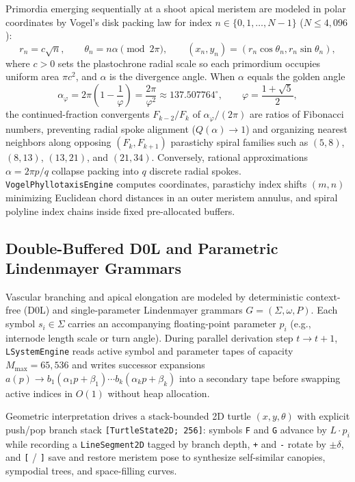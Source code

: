 \documentclass[12pt]{article}
\begin{document}
Primordia emerging sequentially at a shoot apical meristem are modeled in polar coordinates by Vogel's disk packing law \cite{vogel1979better} for index $n \in \{0, 1, \dots, N-1\}$ ($N \le 4{,}096$):
\begin{equation}
r_n = c \sqrt{n}, \qquad \theta_n = n \alpha \pmod{2\pi}, \qquad (x_n, y_n) = (r_n \cos\theta_n, r_n \sin\theta_n),
\label{eq:vogel}
\end{equation}
where $c > 0$ sets the plastochrone radial scale so each primordium occupies uniform area $\pi c^2$, and $\alpha$ is the divergence angle. When $\alpha$ equals the golden angle
\begin{equation}
\alpha_{\varphi} = 2\pi \left(1 - \frac{1}{\varphi}\right) = \frac{2\pi}{\varphi^2} \approx 137.507764^\circ, \qquad \varphi = \frac{1 + \sqrt{5}}{2},
\end{equation}
the continued-fraction convergents $F_{k-2}/F_k$ of $\alpha_{\varphi}/(2\pi)$ are ratios of Fibonacci numbers, preventing radial spoke alignment ($Q(\alpha) \to 1$) and organizing nearest neighbors along opposing $(F_k, F_{k+1})$ parastichy spiral families such as $(5, 8)$, $(8, 13)$, $(13, 21)$, and $(21, 34)$. Conversely, rational approximations $\alpha = 2\pi p / q$ collapse packing into $q$ discrete radial spokes. \texttt{VogelPhyllotaxisEngine} computes coordinates, parastichy index shifts $(m, n)$ minimizing Euclidean chord distances in an outer meristem annulus, and spiral polyline index chains inside fixed pre-allocated buffers.

\subsection{Double-Buffered D0L and Parametric Lindenmayer Grammars}

Vascular branching and apical elongation are modeled by deterministic context-free (D0L) and single-parameter Lindenmayer grammars \cite{lindenmayer1968mathematical, prusinkiewicz1990algorithmic} $G = (\Sigma, \omega, P)$. Each symbol $s_i \in \Sigma$ carries an accompanying floating-point parameter $p_i$ (e.g., internode length scale or turn angle). During parallel derivation step $t \to t + 1$, \texttt{LSystemEngine} reads active symbol and parameter tapes of capacity $M_{\max} = 65{,}536$ and writes successor expansions $a(p) \to b_1(\alpha_1 p + \beta_1) \cdots b_k(\alpha_k p + \beta_k)$ into a secondary tape before swapping active indices in $O(1)$ without heap allocation.

Geometric interpretation drives a stack-bounded 2D turtle $(x, y, \theta)$ with explicit push/pop branch stack \texttt{[TurtleState2D; 256]}: symbols \texttt{F} and \texttt{G} advance by $L \cdot p_i$ while recording a \texttt{LineSegment2D} tagged by branch depth, \texttt{+} and \texttt{-} rotate by $\pm \delta$, and \texttt{[} / \texttt{]} save and restore meristem pose to synthesize self-similar canopies, sympodial trees, and space-filling curves.
\end{document}
